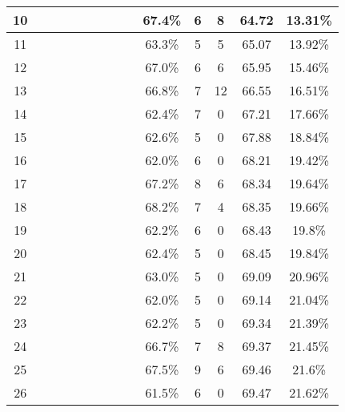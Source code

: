 \begin{longtable}{|c|c|c|c|c|c|c|c|c|c|c|c|c|c|}
10 &  \x    & \x    & \x    &       & \x\m  & \x    & \x\m  &       & 67.4\% &  6  & 8  & 64.72 & 13.31\% \\ \hline
11 &  \x    & \x    & \x    &       & \x    & \x    & \x\m  &       & 63.3\% &  5  & 5  & 65.07 & 13.92\% \\ \hline
12 &  \x    & \x    & \x    & \x    & \x\m  & \x\m  &       &       & 67.0\% &  6  & 6  & 65.95 & 15.46\% \\ \hline
13 &  \x    & \x    & \x    & \x    & \x\m  & \x\m  & \x\m  &       & 66.8\% &  7  & 12 & 66.55 & 16.51\% \\ \hline
14 &  \x    & \x    & \x    &       & \x    &       &       & \x\m  & 62.4\% &  7  & 0  & 67.21 & 17.66\% \\ \hline
15 &  \x    & \x    & \x    & \x    & \x    & \x    &       &       & 62.6\% &  5  & 0  & 67.88 & 18.84\% \\ \hline
16 &  \x    & \x    & \x    &       & \x    & \x    &       & \x    & 62.0\% &  6  & 0  & 68.21 & 19.42\% \\ \hline
17 &  \x    & \x    & \x    &       & \x\m  & \x\m  &       &       & 67.2\% &  8  & 6  & 68.34 & 19.64\% \\ \hline
18 &  \x    & \x    & \x    &       & \x\m  &       &       & \x\m  & 68.2\% &  7  & 4  & 68.35 & 19.66\% \\ \hline
19 &  \x    & \x    & \x    & \x    & \x    & \x    & \x    &       & 62.2\% &  6  & 0  & 68.43 & 19.8\% \\ \hline
20 &  \x    & \x    & \x    & \x    & \x    &       &       & \x\m  & 62.4\% &  5  & 0  & 68.45 & 19.84\% \\ \hline
21 &  \x    & \x    & \x    &       & \x    &       &       &       & 63.0\% &  5  & 0  & 69.09 & 20.96\% \\ \hline
22 &  \x    & \x    & \x    & \x    &       & \x    &       &       & 62.0\% &  5  & 0  & 69.14 & 21.04\% \\ \hline
23 &  \x    & \x    & \x    &       & \x    &       & \x    &       & 62.2\% &  5  & 0  & 69.34 & 21.39\% \\ \hline
24 &  \x    & \x    & \x    & \x    & \x\m  & \x    & \x    &       & 66.7\% &  7  & 8  & 69.37 & 21.45\% \\ \hline
25 &  \x    & \x    & \x    & \x    & \x\m  &       &       & \x\m  & 67.5\% &  9  & 6  & 69.46 & 21.6\% \\ \hline
26 &  \x    & \x    & \x    & \x    & \x    & \x\m  & \x    &       & 61.5\% &  6  & 0  & 69.47 & 21.62\% \\ \hline

\end{longtable}
